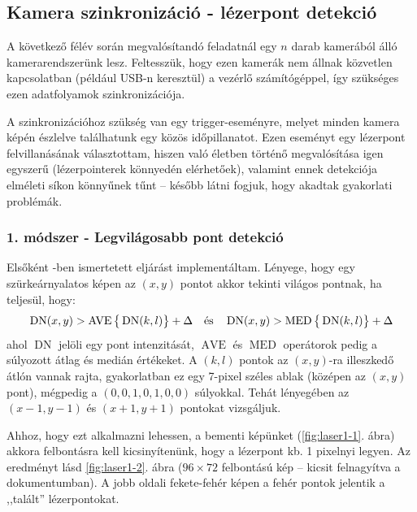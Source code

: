 \documentclass[a4paper,oneside]{article}
\DeclareMathOperator{\myDN}{DN}
\DeclareMathOperator{\myAVE}{AVE}
\DeclareMathOperator{\myMED}{MED}
\begin{document}


\subsection{Kamera szinkronizáció - lézerpont detekció}

A következő félév során megvalósítandó feladatnál egy $n$ darab kamerából álló kamerarendszerünk lesz. Feltesszük, hogy ezen kamerák nem állnak közvetlen kapcsolatban (például USB-n keresztül) a vezérlő számítógéppel, így szükséges ezen adatfolyamok szinkronizációja.

A szinkronizációhoz szükség van egy trigger-eseményre, melyet minden kamera képén észlelve találhatunk egy közös időpillanatot. Ezen eseményt egy lézerpont felvillanásának választottam, hiszen való életben történő megvalósítása igen egyszerű (lézerpointerek könnyedén elérhetőek), valamint ennek detekciója elméleti síkon könnyűnek tűnt -- később látni fogjuk, hogy akadtak gyakorlati problémák.

\subsubsection{1. módszer - Legvilágosabb pont detekció}

Elsőként \cite{brightest-spot}-ben ismertetett eljárást implementáltam. Lényege, hogy egy szürkeárnyalatos képen az $(x, y)$ pontot akkor tekinti világos pontnak, ha teljesül, hogy:
\[\myDN(x, y) > \myAVE\big\{\myDN(k, l)\big\} + \Delta \quad \hbox{és} \quad \myDN(x, y) > \myMED\big\{\myDN(k, l)\big\} + \Delta\]
ahol $\myDN$ jelöli egy pont intenzitását, $\myAVE$ és $\myMED$ operátorok pedig a súlyozott átlag és medián értékeket. A $(k, l)$ pontok az $(x, y)$-ra illeszkedő átlón vannak rajta, gyakorlatban ez egy 7-pixel széles ablak (középen az $(x, y)$ pont), mégpedig a $(0, 0, 1, 0, 1, 0, 0)$ súlyokkal. Tehát lényegében az $(x-1, y-1)$ és $(x+1, y+1)$ pontokat vizsgáljuk.

Ahhoz, hogy ezt alkalmazni lehessen, a bementi képünket (\ref{fig:laser1-1}. ábra) akkora felbontásra kell kicsinyítenünk, hogy a lézerpont kb. 1 pixelnyi legyen. Az eredményt lásd \ref{fig:laser1-2}. ábra ($96\times 72$ felbontású kép -- kicsit felnagyítva a dokumentumban). A jobb oldali fekete-fehér képen a fehér pontok jelentik a ,,talált'' lézerpontokat.
\end{document}

